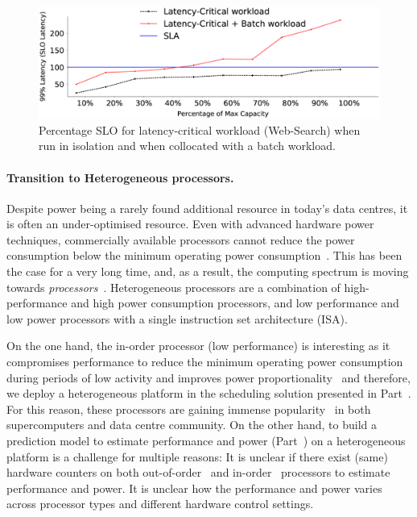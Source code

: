 \begin{figure}[htb] 
    \centering
    \includegraphics[width=\textwidth]{Chapter0/Figs/colloc.eps}
    \caption[Colloation of latency-critical and batch workload]{ Percentage SLO for latency-critical workload (Web-Search) when run in isolation and when collocated with a batch workload.}
    \label{fig: collocation}
\end{figure}

 \paragraph{Transition to Heterogeneous processors.} Despite power being a
rarely found additional resource in today's data centres, it is often an under-optimised
resource.  Even with advanced hardware power techniques, commercially available processors
cannot reduce the power consumption below the minimum operating power
consumption~\citep{Halpern2016MobileSatisfaction, Wong2012KnightShift:Heterogeneity}.
This has been the case for a very long time, and, as a result, the computing spectrum is
moving towards \emph{\het \muc processors}~\citep{JanapaReddi2010WebCores,
Chitlur2012QuickIA:Prototypes, Guevara2013NavigatingMechanisms, 7855903}.  Heterogeneous \muc
processors are a combination of high-performance and high power consumption processors,
and low performance and low power processors with a single instruction set architecture
(ISA). 


On the one hand, the in-order processor (low performance) is interesting as it compromises
performance to reduce the minimum operating power consumption during periods of low
activity and improves power proportionality~\citep{JanapaReddi:2010:WSU:1816038.1816002}
and therefore, we deploy a heterogeneous platform in the scheduling solution presented in
Part~.  For this reason, these processors are gaining immense
popularity~\citep{montblanc, montblanc2, montblancproto, Rajovic:2013:SCC:2503210.2503281,
armmuscle} in both supercomputers and data centre community. On the other hand, to build a
prediction model to estimate performance and power (Part~) on a heterogeneous
platform is a challenge for multiple reasons: {\small {}} It is unclear if there
exist (same) hardware counters on both out-of-order~\citep{Cristal:2004:OCP:1072448.1072456} and
in-order~\citep{JanapaReddi:2010:WSU:1816038.1816002} processors to estimate performance
and power.  {\small {}} It is unclear how the performance and power varies across
processor types and different hardware control settings.

